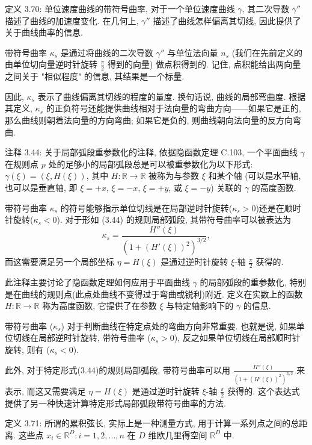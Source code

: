 \documentclass[a4paper]{ctexart}
\begin{document}
{定义 3.70: 单位速度曲线的带符号曲率, 对于一个单位速度曲线 $\gamma$, 
其二次导数 $\gamma''$ 描述了曲线的加速度变化. 在几何上, $\gamma''$ 描述了曲线怎样偏离其切线, 
因此提供了关于曲线曲率的信息. 

带符号曲率 $\kappa_s$ 是通过将曲线的二次导数 $\gamma''$ 与单位法向量 $n_s$
(我们在先前定义的由单位切向量逆时针旋转 $\frac{\pi}{2}$ 得到的向量) 做点积得到的. 
记住, 点积能给出两向量之间关于 "相似程度" 的信息, 其结果是一个标量. 

因此, $\kappa_s$ 表示了曲线偏离其切线的程度的量度. 换句话说, 
曲线的局部弯曲度. 根据其定义, $\kappa_s$ 的正负符号还能提供曲线相对于法向量的弯曲方向——如果它是正的, 
那么曲线则朝着法向量的方向弯曲; 如果它是负的, 则曲线朝向法向量的反方向弯曲. 

注释 3.44: 关于局部弧段重参数化的注释, 依据隐函数定理 C.103, 一个平面曲线 $\gamma$ 在规则点 $p$ 
处的足够小的局部弧段总是可以被重参数化为以下形式: $\gamma(\xi) = (\xi, H(\xi))$, 
其中 $H: \mathbb{R} \rightarrow \mathbb{R}$ 被称为与参数 $\xi$ 和某个轴
(可以是水平轴, 也可以是垂直轴, 即 $\xi = +x$, $\xi = -x$, $\xi = +y$, 或 $\xi = -y$) 关联的 $\gamma$ 的高度函数.

带符号曲率 $\kappa_s$ 的符号能够指示单位切线是在局部逆时针旋转($\kappa_s > 0$)还是在顺时针旋转($\kappa_s < 0$). 
对于形如 (3.44) 的规则局部弧段, 其带符号曲率可以被表达为
$$
\kappa_s = \frac{H''(\xi)}{(1 + (H'(\xi))^2)^{3/2}},
$$
而这需要满足另一个局部坐标 $\eta = H(\xi)$ 是通过逆时针旋转 $\xi$-轴 $\frac{\pi}{2}$ 获得的.

此注释主要讨论了隐函数定理如何应用于平面曲线 $\gamma$ 的局部弧段的重参数化, 特别是在曲线的规则点(此点处曲线不变得过于弯曲或锐利)附近.
定义在实数上的函数 $H: \mathbb{R} \rightarrow \mathbb{R}$ 称为高度函数, 它提供了在参数 $\xi$ 
与特定轴影响下的 $\gamma$ 的信息.

带符号曲率 ($\kappa_s$) 对于判断曲线在特定点处的弯曲方向非常重要. 
也就是说, 如果单位切线在局部逆时针旋转, 带符号曲率 ($\kappa_s > 0$), 反之如果单位切线在局部顺时针旋转, 则有 ($\kappa_s < 0$).

此外, 对于特定形式(3.44)的规则局部弧段, 带符号曲率可以用 $\frac{H''(\xi)}{(1 + (H'(\xi))^2)^{3/2}}$ 来表示, 
而这又需要满足 $\eta = H(\xi)$ 是通过逆时针旋转 $\xi$-轴 $\frac{\pi}{2}$ 获得的. 
这个表达式提供了另一种快速计算特定形式局部弧段带符号曲率的方法.

定义 3.71: 所谓的累积弦长, 实际上是一种测量方式, 用于计算一系列点之间的总距离. 
这些点 ${x_i \in \mathbb{R}^D : i = 1, 2, . . . , n}$ 在 $D$ 维欧几里得空间 $\mathbb{R}^D$ 中. 

}
\end{document}
